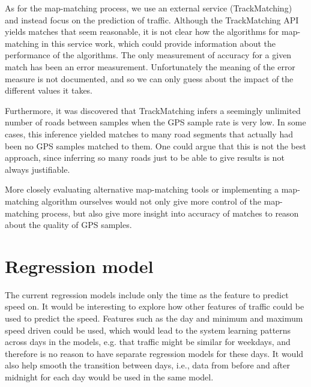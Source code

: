 As for the map-matching process, we use an external service (TrackMatching) and instead focus on the prediction of traffic. Although the TrackMatching API yields matches that seem reasonable, it is not clear how the algorithms for map-matching in this service work, which could provide information about the performance of the algorithms. The only measurement of accuracy for a given match has been an error measurement. Unfortunately the meaning of the error measure is not documented, and so we can only guess about the impact of the different values it takes. 

Furthermore, it was discovered that TrackMatching infers a seemingly unlimited number of roads between samples when the GPS sample rate is very low. In some cases, this inference yielded matches to many road segments that actually had been no GPS samples matched to them. One could argue that this is not the best approach, since inferring so many roads just to be able to give results is not always justifiable.

More closely evaluating alternative map-matching tools or implementing a map-matching algorithm ourselves would not only give more control of the map-matching process, but also give more insight into accuracy of matches to reason about the quality of GPS samples.


\section{Regression model}
The current regression models include only the time as the feature to predict speed on. It would be interesting to explore how other features of traffic could be used to predict the speed. Features such as the day and minimum and maximum speed driven could be used, which would lead to the system learning patterns across days in the models, e.g. that traffic might be similar for weekdays, and therefore is no reason to have separate regression models for these days. It would also help smooth the transition between days, i.e., data from before and after midnight for each day would be used in the same model.

